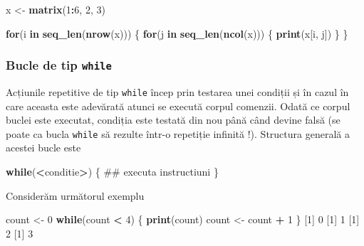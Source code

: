 \documentclass[]{article}
\newenvironment{Shaded}{\begin{snugshade}}{\end{snugshade}}
\newcommand{\KeywordTok}[1]{\textcolor[rgb]{0.13,0.29,0.53}{\textbf{#1}}}
\newcommand{\DecValTok}[1]{\textcolor[rgb]{0.00,0.00,0.81}{#1}}
\newcommand{\StringTok}[1]{\textcolor[rgb]{0.31,0.60,0.02}{#1}}
\newcommand{\ControlFlowTok}[1]{\textcolor[rgb]{0.13,0.29,0.53}{\textbf{#1}}}
\newcommand{\OperatorTok}[1]{\textcolor[rgb]{0.81,0.36,0.00}{\textbf{#1}}}
\newcommand{\NormalTok}[1]{#1}
\begin{document}
\begin{Shaded}
\begin{Highlighting}[]
\NormalTok{x <-}\StringTok{ }\KeywordTok{matrix}\NormalTok{(}\DecValTok{1}\OperatorTok{:}\DecValTok{6}\NormalTok{, }\DecValTok{2}\NormalTok{, }\DecValTok{3}\NormalTok{)}

\ControlFlowTok{for}\NormalTok{(i }\ControlFlowTok{in} \KeywordTok{seq_len}\NormalTok{(}\KeywordTok{nrow}\NormalTok{(x))) \{}
        \ControlFlowTok{for}\NormalTok{(j }\ControlFlowTok{in} \KeywordTok{seq_len}\NormalTok{(}\KeywordTok{ncol}\NormalTok{(x))) \{}
                \KeywordTok{print}\NormalTok{(x[i, j])}
\NormalTok{        \}   }
\NormalTok{\}}
\end{Highlighting}
\end{Shaded}

\subsubsection{\texorpdfstring{Bucle de tip
\texttt{while}}{Bucle de tip while}}\label{bucle-de-tip-while}

Acțiunile repetitive de tip \texttt{while} încep prin testarea unei
condiții și în cazul în care aceasta este adevărată atunci se execută
corpul comenzii. Odată ce corpul buclei este executat, condiția este
testată din nou până când devine falsă (se poate ca bucla \texttt{while}
să rezulte într-o repetiție infinită !). Structura generală a acestei
bucle este

\begin{Shaded}
\begin{Highlighting}[]
\ControlFlowTok{while}\NormalTok{(}\OperatorTok{<}\NormalTok{conditie}\OperatorTok{>}\NormalTok{) \{}
\NormalTok{        ## executa instructiuni}
\NormalTok{\} }
\end{Highlighting}
\end{Shaded}

Considerăm următorul exemplu

\begin{Shaded}
\begin{Highlighting}[]
\NormalTok{count <-}\StringTok{ }\DecValTok{0}
\ControlFlowTok{while}\NormalTok{(count }\OperatorTok{<}\StringTok{ }\DecValTok{4}\NormalTok{) \{}
        \KeywordTok{print}\NormalTok{(count)}
\NormalTok{        count <-}\StringTok{ }\NormalTok{count }\OperatorTok{+}\StringTok{ }\DecValTok{1}
\NormalTok{\}}
\NormalTok{[}\DecValTok{1}\NormalTok{] }\DecValTok{0}
\NormalTok{[}\DecValTok{1}\NormalTok{] }\DecValTok{1}
\NormalTok{[}\DecValTok{1}\NormalTok{] }\DecValTok{2}
\NormalTok{[}\DecValTok{1}\NormalTok{] }\DecValTok{3}
\end{Highlighting}
\end{Shaded}
\end{document}
